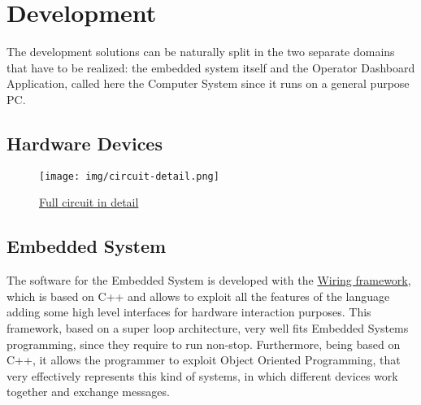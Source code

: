 \documentclass[a4paper,12pt]{report}
\begin{document}
	\chapter{Development}
	The development solutions can be naturally split in the two separate domains that have to be realized: the embedded system itself and the Operator Dashboard Application, called here the Computer System since it runs on a general purpose PC.
	
	\section{Hardware Devices}
	\begin{figure}
		\centering
		\texttt{[image: img/circuit-detail.png]}
		\caption{\href{https://www.tinkercad.com/things/1OaxE8QuWbw-esiot-assignment02?sharecode=9QQajaw8It3u4rzvy1XqA17RKAIlDJlUtWD6_dBJsmI}{Full circuit in detail}}
		\label{img:full-circuit}
	\end{figure}
	
	\section{Embedded System}
	The software for the Embedded System is developed with the \href{https://wiring.org.co/}{Wiring framework}, which is based on C++ and allows to exploit all the features of the language adding some high level interfaces for hardware interaction purposes. This framework, based on a super loop architecture, very well fits Embedded Systems programming, since they require to run non-stop. Furthermore, being based on C++, it allows the programmer to exploit Object Oriented Programming, that very effectively represents this kind of systems, in which different devices work together and exchange messages.
	
\end{document}
